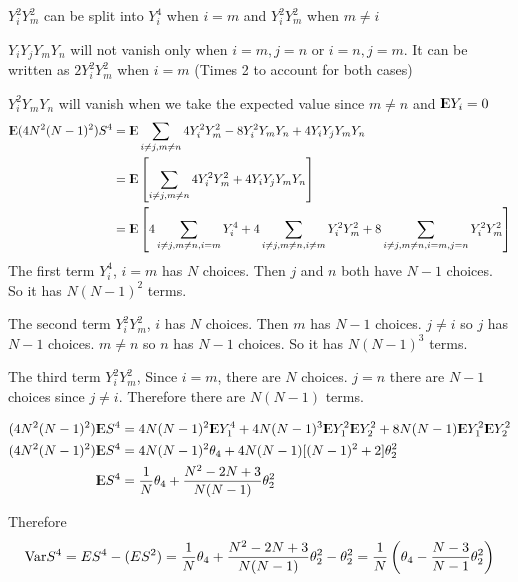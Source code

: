 \documentclass[12pt]{article}
\begin{document}
$Y_i^2Y_m^2$ can be split into $Y_i^4$ when $i=m$ and $Y_i^2Y_m^2$ when $m\neq i$

$Y_iY_jY_mY_n$ will not vanish only when $i =m, j = n$ or $i = n, j = m$. It can be written as  $2Y_i^2Y_m^2$ when $i=m$ (Times 2 to account for both cases)


$Y_i^2 Y_m Y_n$ will vanish when we take the expected value since $m \neq n$ and ${\rm I\kern-.3em E} Y_i=0$ 
$$\begin{aligned}
	{\rm I\kern-.3em E} (4N^2(N-1)^2)S^4 &= {\rm I\kern-.3em E} \sum_{i\neq j, m\neq n} 4 Y_i^2 Y_m^2 - 8 Y_i^2 Y_m Y_n + 4 Y_iY_jY_mY_n \\
	&={\rm I\kern-.3em E}\left[ \sum_{i\neq j, m\neq n} 4 Y_i^2 Y_m^2  + 4 Y_iY_jY_mY_n \right] \\
	&={\rm I\kern-.3em E} \left[4 \sum_{i\neq j, m\neq n, i=m} Y_i^4 + 4 \sum_{i\neq j, m\neq n, i\neq m}   Y_i^2 Y_m^2 + 8 \sum_{i\neq j, m\neq n, i=m, j=n} Y_i^2 Y_m^2 \right]
\end{aligned}
$$
The first term $Y_i^4$, $i=m$ has $N$ choices. Then $j$ and $n$ both have $N-1$ choices. So it has $N(N-1)^2$ terms.

The second term $ Y_i^2 Y_m^2$, $i$ has $N$ choices. Then $m$ has $N-1$ choices. $j \neq i$ so $j$ has $N-1$ choices. $m\neq n$ so $n$ has $N-1$ choices. So it has $N(N-1)^3$ terms.

The third term $Y_i^2 Y_m^2$, Since $i=m$, there are $N$ choices. $j=n$ there are $N-1$ choices since $j\neq i$.  Therefore there are $N(N-1)$ terms.


$$
\begin{aligned}
		(4N^2(N-1)^2)\E S^4 &= 4N(N-1)^2  \E Y_1^4 + 4 N(N-1)^3 \E Y_1^2 \E Y_2^2 + 8 N(N-1) \E Y_1^2 \E Y_2^2  \\
		(4N^2(N-1)^2)\E S^4 &=4N(N-1)^2\theta_4 + 4N(N-1)[(N-1)^2 + 2] \theta_2^2 \\
		\E S^4 &=\frac{1}{N}\theta_4 + \frac{N^2 - 2N + 3}{N(N-1)} \theta_2^2 \\
\end{aligned}
$$

Therefore $$\mathrm{Var} S^4 = ES^4 -(ES^2) = \frac{1}{N}\theta_4 + \frac{N^2 - 2N + 3}{N(N-1)} \theta_2^2 - \theta_2^2 =  \frac{1}{N} \left(\theta_4 - \frac{N-3}{N-1} \theta_2^2 \right)
$$
\QED
\end{document}
